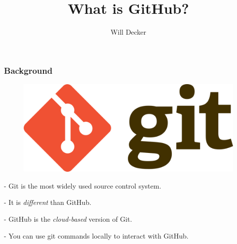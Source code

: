 \documentclass{beamer}
\title{What is GitHub?}
\author{Will Decker}
\begin{document}
\frame{\titlepage}

\begin{frame}
\frametitle{Background}

\begin{figure}[t]
\includegraphics[scale=0.05]{images/gitlogo.png}
\end{figure}
- Git is the most widely used source control system.

- It is \textit{different} than GitHub.

- GitHub is the \textit{cloud-based} version of Git. 

\hspace{10mm} - You can use git commands locally to interact with GitHub.
\end{frame}
\end{document}
